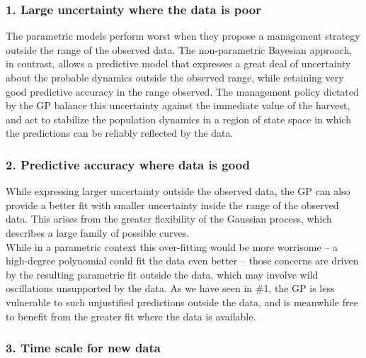 \documentclass[author-year, review]{elsarticle} %
\begin{document}
\subsubsection{1. Large uncertainty where the data is poor}

The parametric models perform worst when they propose a management
strategy outside the range of the observed data. The non-parametric
Bayesian approach, in contrast, allows a predictive model that expresses
a great deal of uncertainty about the probable dynamics outside the
observed range, while retaining very good predictive accuracy in the
range observed. The management policy dictated by the GP balance this
uncertainty against the immediate value of the harvest, and act to
stabilize the population dynamics in a region of state space in which
the predictions can be reliably reflected by the data.

\subsubsection{2. Predictive accuracy where data is good}

While expressing larger uncertainty outside the observed data, the GP
can also provide a better fit with smaller uncertainty inside the range
of the observed data. This arises from the greater flexibility of the
Gaussian process, which describes a large family of possible
curves.\\While in a parametric context this over-fitting would be more
worrisome -- a high-degree polynomial could fit the data even better --
those concerns are driven by the resulting parametric fit outside the
data, which may involve wild oscillations unsupported by the data. As we
have seen in \#1, the GP is less vulnerable to such unjustified
predictions outside the data, and is meanwhile free to benefit from the
greater fit where the data is available.

\subsubsection{3. Time scale for new data}
\end{document}
